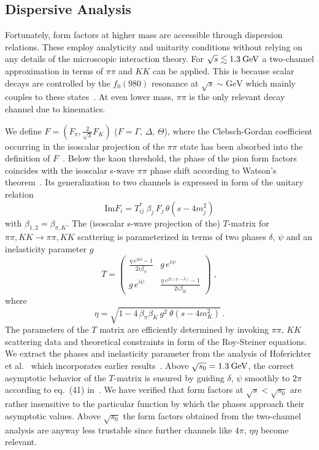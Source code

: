 \documentclass[preprintnumbers,twocolumn,aps,floats,nofootinbib]{revtex4-1}
\newcommand{\eVdist}{\kern-0.06em}
\newcommand{\gev}{\:\text{Ge\eVdist V}}
\begin{document}
\subsection{Dispersive Analysis}

Fortunately, form factors at higher mass are accessible through dispersion relations. These employ analyticity and unitarity conditions without relying on any details of the microscopic interaction theory. For $\sqrt{s}\lesssim 1.3\gev$ a two-channel approximation in terms of $\pi\pi$ and $KK$ can be applied. This is because scalar decays are controlled by the $f_0(980)$ resonance at $\sqrt{s}\sim\text{GeV}$ which mainly couples to these states~\cite{Patrignani:2016xqp}. At even lower mass, $\pi\pi$ is the only relevant decay channel due to kinematics.

We define $F=(F_\pi,\frac{2}{\sqrt{3}}F_K)$ ($F=\Gamma,\,\Delta,\,\Theta$), where the Clebsch-Gordan coefficient occurring in the isoscalar projection of the $\pi\pi$ state has been absorbed into the definition of $F$~\cite{Donoghue:1990xh}. Below the kaon threshold, the phase of the pion form factors coincides with the isoscalar s-wave $\pi\pi$ phase shift according to Watson's theorem~\cite{Watson:1954uc}. Its generalization to two channels is expressed in form of the unitary relation 
\begin{equation}\label{eq:unitary}
 \text{Im}F_i = T_{ij}^* \:\beta_j\, F_j \,\theta(s-4m_j^2) 
\end{equation}
with $\beta_{1,2}=\beta_{\pi,K}$. The (isoscalar s-wave projection of the) $T$-matrix for $\pi\pi,KK\rightarrow \pi\pi,KK$ scattering is parameterized in terms of two phases $\delta$, $\psi$ and an inelasticity parameter $g$
\begin{equation}
 T=\begin{pmatrix}
    \frac{\eta\:e^{2i\delta}-1}{2i\beta_\pi} &
    g \,e^{i \psi}\\
    g \,e^{i \psi}&
\frac{\eta\:e^{2i(\psi-\delta)}-1}{2i\beta_K}  
   \end{pmatrix}
   \;,
\end{equation}
where
\begin{equation}
\eta=\sqrt{1-4\,\beta_\pi\beta_K \,g^2 \:\theta(s-4 m_K^2)}\,.
\end{equation}
The parameters of the $T$ matrix are efficiently determined by invoking $\pi\pi,\,KK$ scattering data and theoretical constraints in form of the Roy-Steiner equations. We extract the phases and inelasticity parameter from the analysis of Hoferichter et al.~\cite{Hoferichter:2012wf} which incorporates earlier results~\cite{Caprini:2011ky,Buettiker:2003pp}. Above $\sqrt{s_0}=1.3\gev$, the correct asymptotic behavior of the $T$-matrix is ensured by guiding $\delta,\,\psi$ smoothly to $2\pi$ according to eq.\ (41) in~\cite{Moussallam:1999aq}. We have verified that form factors at $\sqrt{s}<\sqrt{s_0}$ are rather insensitive to the particular function by which the phases approach their asymptotic values. Above $\sqrt{s_0}$ the form factors obtained from the two-channel analysis are anyway less trustable since further channels like $4\pi,\,\eta\eta$ become relevant.
\end{document}
